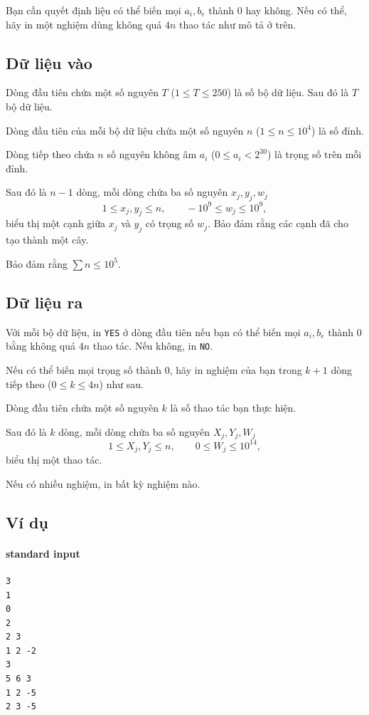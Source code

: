 \documentclass[11pt]{article}
\begin{document}
Bạn cần quyết định liệu có thể biến mọi \(a_i,b_e\) thành \(0\) hay không.
Nếu có thể, hãy in một nghiệm dùng không quá \(4n\) thao tác như mô tả ở
trên.

\subsection*{Dữ liệu vào}

Dòng đầu tiên chứa một số nguyên \(T\) (\(1\le T\le 250\)) là số bộ dữ liệu.
Sau đó là \(T\) bộ dữ liệu.

Dòng đầu tiên của mỗi bộ dữ liệu chứa một số nguyên \(n\) (\(1\le n\le
10^4\)) là số đỉnh.

Dòng tiếp theo chứa \(n\) số nguyên không âm \(a_i\) (\(0\le a_i<2^{30}\)) là
trọng số trên mỗi đỉnh.

Sau đó là \(n-1\) dòng, mỗi dòng chứa ba số nguyên \(x_j,y_j,w_j\)
\[
  1\le x_j,y_j\le n,\qquad -10^9\le w_j\le 10^9,
\]
biểu thị một cạnh giữa \(x_j\) và \(y_j\) có trọng số \(w_j\). Bảo đảm rằng
các cạnh đã cho tạo thành một cây.

Bảo đảm rằng \(\sum n\le 10^5\).

\subsection*{Dữ liệu ra}

Với mỗi bộ dữ liệu, in \texttt{YES} ở dòng đầu tiên nếu bạn có thể biến mọi
\(a_i,b_e\) thành \(0\) bằng không quá \(4n\) thao tác. Nếu không, in
\texttt{NO}.

Nếu có thể biến mọi trọng số thành \(0\), hãy in nghiệm của bạn trong \(k+1\)
dòng tiếp theo (\(0\le k\le 4n\)) như sau.

Dòng đầu tiên chứa một số nguyên \(k\) là số thao tác bạn thực hiện.

Sau đó là \(k\) dòng, mỗi dòng chứa ba số nguyên \(X_j,Y_j,W_j\)
\[
  1\le X_j,Y_j\le n,\qquad 0\le W_j\le 10^{14},
\]
biểu thị một thao tác.

Nếu có nhiều nghiệm, in bất kỳ nghiệm nào.

\subsection*{Ví dụ}

\paragraph{standard input}
\begin{verbatim}
3
1
0
2
2 3
1 2 -2
3
5 6 3
1 2 -5
2 3 -5
\end{verbatim}
\end{document}
